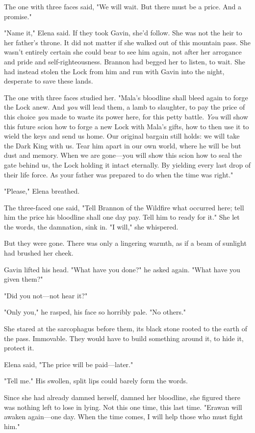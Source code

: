 The one with three faces said, "We will wait.
But there must be a price.
And a promise."

"Name it," Elena said.
If they took Gavin, she'd follow.
She was not the heir to her father's throne.
It did not matter if she walked out of this mountain pass.
She wasn't entirely certain she could bear to see him again, not after her arrogance and pride and self-righteousness.
Brannon had begged her to listen, to wait.
She had instead stolen the Lock from him and run with Gavin into the night, desperate to save these lands.

The one with three faces studied her.
"Mala's bloodline shall bleed again to forge the Lock anew.
And \emph{you} will lead them, a lamb to slaughter, to pay the price of this choice \emph{you} made to waste its power here, for this petty battle.
\emph{You} will show this future scion how to forge a new Lock with Mala's gifts, how to then use it to wield the keys and send us home.
Our original bargain still holds: we will take the Dark King with us.
Tear him apart in our own world, where he will be but dust and memory.
When we are gone---you will show this scion how to seal the gate behind us, the Lock holding it intact eternally.
By yielding every last drop of their life force.
As your father was prepared to do when the time was right."

"Please," Elena breathed.

The three-faced one said, "Tell Brannon of the Wildfire what occurred here; tell him the price his bloodline shall one day pay.
Tell him to ready for it."
She let the words, the damnation, sink in.
"I will," she whispered.

But they were gone.
There was only a lingering warmth, as if a beam of sunlight had brushed her cheek.

Gavin lifted his head.
"What have you done?"
he asked again.
"What have you given them?"

"Did you not---not hear it?"

"Only you," he rasped, his face so horribly pale.
"No others."

She stared at the sarcophagus before them, its black stone rooted to the earth of the pass.
Immovable.
They would have to build something around it, to hide it, protect it.

Elena said, "The price will be paid---later."

"Tell me."
His swollen, split lips could barely form the words.

Since she had already damned herself, damned her bloodline, she figured there was nothing left to lose in lying.
Not this one time, this last time.
"Erawan will awaken again---one day.
When the time comes, I will help those who must fight him."

